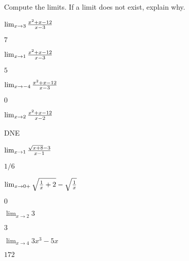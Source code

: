 \begin{exercises}

\noindent Compute the limits. If a limit does not exist, explain why.

\twocol

\begin{exercise} $\lim_{x\to 3}{x^2+x-12\over x-3}$
\begin{answer} $7$
\end{answer}\end{exercise}

\begin{exercise} $\lim_{x\to 1}{x^2+x-12\over x-3}$
\begin{answer} $5$
\end{answer}\end{exercise}

\begin{exercise} $\lim_{x\to -4}{x^2+x-12\over x-3}$
\begin{answer} $0$
\end{answer}\end{exercise}

\begin{exercise} $\lim_{x\to 2} {x^2+x-12\over x-2}$
\begin{answer} DNE
\end{answer}\end{exercise}

\begin{exercise} $\lim_{x\to 1} {\sqrt{x+8}-3\over x-1}$
\begin{answer} $1/6$
\end{answer}\end{exercise}

\begin{exercise} $\lim_{x\to 0+} \sqrt{{1\over x}+2} - \sqrt{1\over x}$
\begin{answer} $0$
\end{answer}\end{exercise}

\begin{exercise} $\lim _{x\to 2} 3$
\begin{answer} $3$
\end{answer}\end{exercise}

\begin{exercise} $\lim _{x\to 4 } 3x^3 - 5x $
\begin{answer} $172$
\end{answer}\end{exercise}


\end{exercises}
